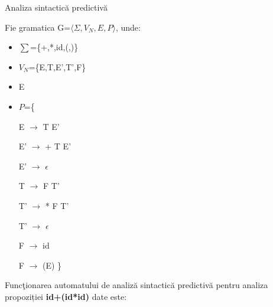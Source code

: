 \documentclass[pdf]{beamer}
\begin{document}
\begin{frame}{Analiza sintactică predictivă}

Fie gramatica G=$\langle \Sigma, V_N, E, P \rangle$, unde:

\begin{itemize}
\item
$\sum$=\{+,*,id,(,)\}
\item
$V_N$=\{E,T,E',T',F\}
\item
E
\item
$P$=\{

\hspace{1cm} E $ \rightarrow $ T E'   

\hspace{1cm} E' $ \rightarrow $ + T E'     

\hspace{1cm} E' $ \rightarrow $ $ \epsilon $

\hspace{1cm} T $ \rightarrow $ F T'    

\hspace{1cm} T' $ \rightarrow $ * F T'      

\hspace{1cm} T' $ \rightarrow $ $ \epsilon $

\hspace{1cm} F $ \rightarrow $ id       

\hspace{1cm} F $ \rightarrow $ (E)
\}
\end{itemize}

Funcţionarea automatului de analiză sintactică predictivă pentru analiza propoziției \textbf{id+(id*id)} date este:
\end{frame}
\end{document}
